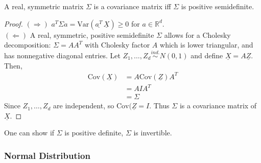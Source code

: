 \documentclass{article}
\newcommand{\R}{\mathbb{R}}
\newcommand{\Var}{\mathrm{Var}}
\newcommand{\Cov}{\mathrm{Cov}}
\begin{document}
			\begin{myprop}{}{}
				A real, symmetric matrix $\Sigma$ is a covariance matrix iff $\Sigma$ is positive semidefinite.
				
				\begin{proof}
					$(\Rightarrow)$ $a^T\Sigma a=\Var(\underline{a^T}\,\underline{X})\geq0$ for $a\in\R^d$.\\
					
					$(\Leftarrow)$ A real, symmetric, positive semidefinite $\Sigma$ allows for a Cholesky decomposition: $\Sigma=AA^T$ with Cholesky factor $A$ which is lower triangular, and has nonnegative diagonal entries. Let $Z_1, \dots, Z_d\stackrel{ind.}{\sim}N(0, 1)$ and define $\underline{X}=A\underline{Z}$. Then,
					\begin{align*}
						\Cov(\underline{X})&=A\Cov(\underline{Z})A^T\\
						&=AIA^T\\
						&=\Sigma
					\end{align*}
					Since $Z_1, \dots, Z_d$ are independent, so $\Cov(\underline{Z}=I$. Thus $\Sigma$ is a covariance matrix of $\underline{X}$.
				\end{proof}
			\end{myprop}
			
			One can show if $\Sigma$ is positive definite, $\Sigma$ is invertible.
			
			\subsubsection{Normal Distribution}
			
\end{document}
